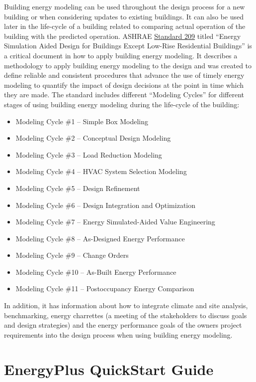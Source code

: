Building energy modeling can be used throughout the design process
for a new building or when considering updates to existing buildings.
It can also be used later in the life-cycle of a building related
to comparing actual operation of the building with the predicted operation.
ASHRAE \href{https://www.techstreet.com/ashrae/standards/ashrae-209-2018?gateway_code=ashrae&product_id=2010483}{Standard 209}
titled ``Energy Simulation Aided Design for Buildings Except Low-Rise
Residential Buildings'' is a critical document in how to apply building
energy modeling. It describes a methodology to apply building energy
modeling to the design and was created to define reliable and consistent
procedures that advance the use of timely energy modeling to quantify
the impact of design decisions at the point in time which they are
made. The standard includes different \textquotedblleft Modeling Cycles\textquotedblright{}
for different stages of using building energy modeling during the
life-cycle of the building:
\begin{itemize}
\item Modeling Cycle \#1 -- Simple Box Modeling
\item Modeling Cycle \#2 -- Conceptual Design Modeling
\item Modeling Cycle \#3 -- Load Reduction Modeling
\item Modeling Cycle \#4 -- HVAC System Selection Modeling
\item Modeling Cycle \#5 -- Design Refinement
\item Modeling Cycle \#6 -- Design Integration and Optimization
\item Modeling Cycle \#7 -- Energy Simulated-Aided Value Engineering
\item Modeling Cycle \#8 -- As-Designed Energy Performance
\item Modeling Cycle \#9 -- Change Orders
\item Modeling Cycle \#10 -- As-Built Energy Performance
\item Modeling Cycle \#11 -- Postoccupancy Energy Comparison
\end{itemize}
In addition, it has information about how to integrate climate and
site analysis, benchmarking, energy charrettes (a meeting of the stakeholders
to discuss goals and design strategies) and the energy performance
goals of the owners project requirements into the design process when
using building energy modeling.

\section{EnergyPlus QuickStart Guide}

